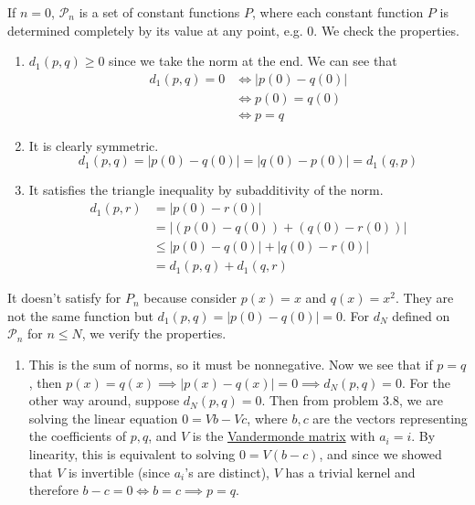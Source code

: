   \begin{solution}
    If $n = 0$, $\mathcal{P}_n$ is a set of constant functions $P$, where each constant function $P$ is determined completely by its value at any point, e.g. $0$. We check the properties. 
    \begin{enumerate}
      \item $d_1 (p, q) \geq 0$ since we take the norm at the end. We can see that 
      \begin{align}
        d_1 (p, q) = 0 & \iff |p(0) - q(0)| \\
                       & \iff p(0) = q(0) \\
                       & \iff p = q
      \end{align} 

      \item It is clearly symmetric. 
      \begin{equation}
        d_1 (p, q) = |p(0) - q(0)| = |q(0) - p(0)| = d_1(q, p)
      \end{equation}

      \item It satisfies the triangle inequality by subadditivity of the norm. 
      \begin{align}
        d_1 (p, r) & = |p(0) - r(0)| \\
                   & = |(p(0) - q(0)) + (q(0) - r(0))| \\
                   & \leq |p(0) - q(0)| + |q(0) - r(0)| \\
                   & = d_1 (p, q) + d_1 (q, r)
      \end{align}
    \end{enumerate}
    It doesn't satisfy for $P_n$ because consider $p(x) = x$ and $q(x) = x^2$. They are not the same function but $d_1 (p, q) = |p(0) - q(0)| = 0$. For $d_N$ defined on $\mathcal{P}_n$ for $n \leq N$, we verify the properties. 
    \begin{enumerate}
      \item This is the sum of norms, so it must be nonnegative. Now we see that if $p = q$, then $p(x) = q(x) \implies |p(x) - q(x)| = 0 \implies d_N (p, q) = 0$. For the other way around, suppose $d_N(p, q) = 0$. Then from problem 3.8, we are solving the linear equation $0 = V b - V c$, where $b, c$ are the vectors representing the coefficients of $p, q$, and $V$ is the \hyperref[lin-def:vandermonde-matrix]{Vandermonde matrix} with $a_i = i$. By linearity, this is equivalent to solving $0 = V(b - c)$, and since we showed that $V$ is invertible (since $a_i$'s are distinct), $V$ has a trivial kernel and therefore $b - c = 0 \iff b = c \implies p = q$. 


\end{enumerate}
\end{solution}
